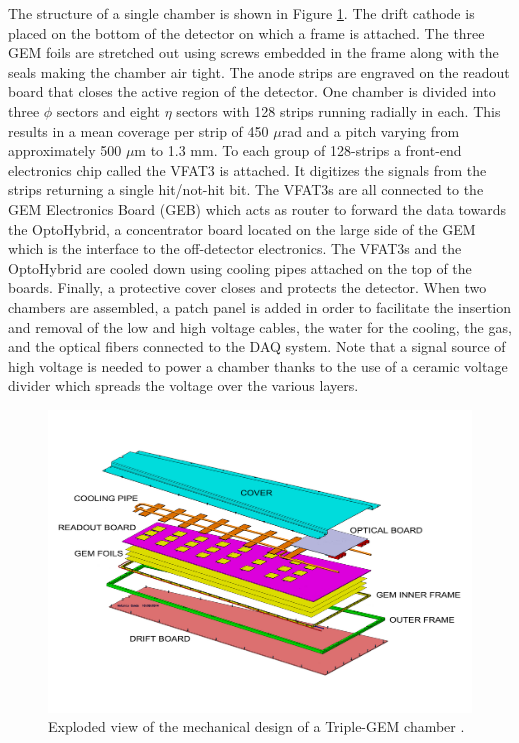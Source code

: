     The structure of a single chamber is shown in Figure \ref{fig:II-1-exploded}. The drift cathode is placed on the bottom of the detector on which a frame is attached. The three GEM foils are stretched out using screws embedded in the frame along with the seals making the chamber air tight. The anode strips are engraved on the readout board that closes the active region of the detector. One chamber is divided into three $ \phi $ sectors and eight $ \eta $ sectors with 128 strips running radially in each. This results in a mean coverage per strip of 450 $\mu$rad and a pitch varying from approximately 500 $\mu$m to 1.3 mm. To each group of 128-strips a front-end electronics chip called the VFAT3 is attached. It digitizes the signals from the strips returning a single hit/not-hit bit. The VFAT3s are all connected to the GEM Electronics Board (GEB) which acts as router to forward the data towards the OptoHybrid, a concentrator board located on the large side of the GEM which is the interface to the off-detector electronics. The VFAT3s and the OptoHybrid are cooled down using cooling pipes attached on the top of the boards. Finally, a protective cover closes and protects the detector. When two chambers are assembled, a patch panel is added in order to facilitate the insertion and removal of the low and high voltage cables, the water for the cooling, the gas, and the optical fibers connected to the DAQ system. Note that a signal source of high voltage is needed to power a chamber thanks to the use of a ceramic voltage divider which spreads the voltage over the various layers. \\

    \begin{figure}[h!]
      \centering
      \includegraphics[width=\textwidth]{img/II-1-gem/gem-exploded.pdf}
      \caption{Exploded view of the mechanical design of a Triple-GEM chamber \cite{Colaleo:2021453}.}
      \label{fig:II-1-exploded}
    \end{figure}

